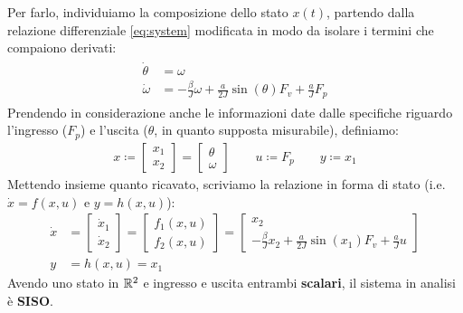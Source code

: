 \documentclass[a4paper, 11pt]{article}
\begin{document}
Per farlo, individuiamo la composizione dello stato $x(t)$,  partendo dalla relazione differenziale \eqref{eq:system} modificata in modo da isolare i termini che compaiono derivati:
\begin{align*}
	\begin{aligned}
		\dot \theta & = \omega \\
		\dot \omega & = -\frac{\beta}{J} \omega + \frac{a}{2J} \sin(\theta) F_v + \frac{a}{J} F_p
	\end{aligned}
\end{align*}
Prendendo in considerazione anche le informazioni date dalle specifiche riguardo l'ingresso ($F_p$) e l'uscita ($\theta$, in quanto supposta misurabile), definiamo:
\begin{align*}
	x \coloneqq \begin{bmatrix}
		x_1 \\ x_2
	\end{bmatrix} = \begin{bmatrix}
		\theta \\ \omega
	\end{bmatrix} \quad \quad u \coloneqq F_p \quad \quad y \coloneqq x_1
\end{align*}
Mettendo insieme quanto ricavato, scriviamo la relazione in forma di stato (i.e. $\dot x = f(x, u)$ e $y = h(x, u)$):
\begin{subequations}\label{eq:fds}
\begin{align}
	\dot x & = \begin{bmatrix}
		\dot x_1 \\ \dot x_2
	\end{bmatrix} = \begin{bmatrix} 
		f_1(x, u) \\ f_2(x, u)
	\end{bmatrix} = \begin{bmatrix}
		x_2 \\ -\frac{\beta}{J} x_2 + \frac{a}{2J} \sin(x_1)F_v + \frac{a}{J} u
	\end{bmatrix} \\
	y & = h(x, u) =  x_1
\end{align}
\end{subequations}
Avendo uno stato in $\mathbb{R}^2$ e ingresso e uscita entrambi \textbf{scalari}, il sistema in analisi è \textbf{SISO}.
\end{document}
